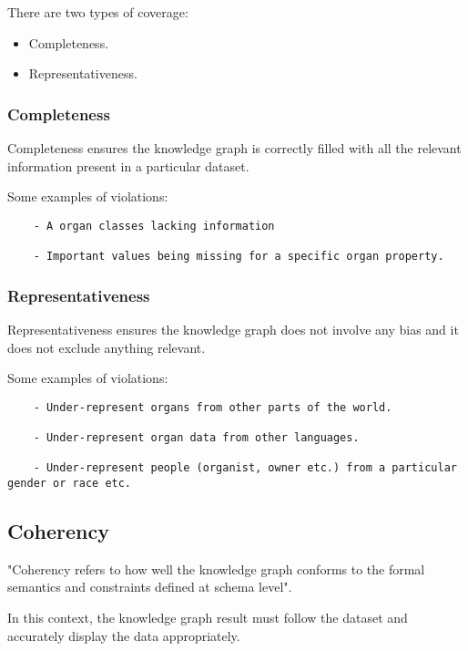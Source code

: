 There are two types of coverage: 
\begin{itemize}
\item Completeness.
\item Representativeness.
\end{itemize}

\subsubsection{Completeness}
\hspace{0.5cm} Completeness ensures the knowledge graph is correctly filled with all the relevant information present in a particular dataset. \cite{knowledgegraphevaulationbook}

Some examples of violations: 
\begin{lstlisting}
    - A organ classes lacking information

    - Important values being missing for a specific organ property. 
\end{lstlisting}

\subsubsection{Representativeness}
\hspace{0.5cm} Representativeness ensures the knowledge graph does not involve any bias and it does not exclude anything relevant. \cite{knowledgegraphevaulationbook}

Some examples of violations: 
\begin{lstlisting}
    - Under-represent organs from other parts of the world.
    
    - Under-represent organ data from other languages.

    - Under-represent people (organist, owner etc.) from a particular gender or race etc.
\end{lstlisting}

\subsection{Coherency}
\hspace{0.5cm} "Coherency refers to how well the knowledge graph conforms to the formal semantics and constraints defined at schema level". \cite{knowledgegraphevaulationbook}

In this context, the knowledge graph result must follow the dataset and accurately display the data appropriately. 

